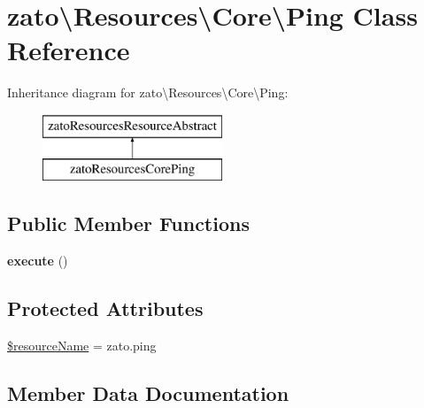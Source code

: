 \hypertarget{classzato_1_1_resources_1_1_core_1_1_ping}{}\section{zato\textbackslash{}Resources\textbackslash{}Core\textbackslash{}Ping Class Reference}
\label{classzato_1_1_resources_1_1_core_1_1_ping}
Inheritance diagram for zato\textbackslash{}Resources\textbackslash{}Core\textbackslash{}Ping\+:\begin{figure}[H]
\begin{center}
\leavevmode
\includegraphics[height=2.000000cm]{classzato_1_1_resources_1_1_core_1_1_ping}
\end{center}
\end{figure}
\subsection*{Public Member Functions}
\begin{DoxyCompactItemize}
\item 
\hypertarget{classzato_1_1_resources_1_1_core_1_1_ping_a0a65349ad498398230002935c8cdf29d}{}{\bfseries execute} ()\label{classzato_1_1_resources_1_1_core_1_1_ping_a0a65349ad498398230002935c8cdf29d}

\end{DoxyCompactItemize}
\subsection*{Protected Attributes}
\begin{DoxyCompactItemize}
\item 
\hyperlink{classzato_1_1_resources_1_1_core_1_1_ping_ae43661c6c12c8b762537bbda5e7e2c1e}{\$resource\+Name} = \textquotesingle{}zato.\+ping\textquotesingle{}
\end{DoxyCompactItemize}


\subsection{Member Data Documentation}
\hypertarget{classzato_1_1_resources_1_1_core_1_1_ping_ae43661c6c12c8b762537bbda5e7e2c1e}{}
